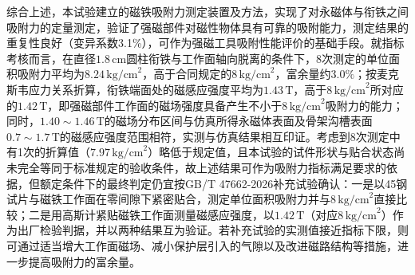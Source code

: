 综合上述，本试验建立的磁铁吸附力测定装置及方法，实现了对永磁体与衔铁之间吸附力的定量测定，验证了强磁部件对磁性物体具有可靠的吸附能力，测定结果的重复性良好（变异系数3.1\%），可作为强磁工具吸附性能评价的基础手段。就指标考核而言，在直径$1.8\,\text{cm}$圆柱衔铁与工作面轴向脱离的条件下，8次测定的单位面积吸附力平均为$8.24\,\text{kg/cm}^2$，高于合同规定的$8\,\text{kg/cm}^2$，富余量约$3.0\%$；按麦克斯韦应力关系折算，衔铁端面处的磁感应强度平均为$1.43\,\text{T}$，高于$8\,\text{kg/cm}^2$所对应的$1.42\,\text{T}$，即强磁部件工作面的磁场强度具备产生不小于$8\,\text{kg/cm}^2$吸附力的能力；同时，$1.40\sim 1.46\,\text{T}$的磁场分布区间与仿真所得永磁体表面及骨架沟槽表面$0.7\sim 1.7\,\text{T}$的磁感应强度范围相符，实测与仿真结果相互印证。考虑到8次测定中有1次的折算值（$7.97\,\text{kg/cm}^2$）略低于规定值，且本试验的试件形状与贴合状态尚未完全等同于标准规定的验收条件，故上述结果可作为吸附力指标满足要求的依据，但额定条件下的最终判定仍宜按GB/T 47662-2026补充试验确认：一是以45钢试片与磁铁工作面在零间隙下紧密贴合，测定单位面积吸附力并与$8\,\text{kg/cm}^2$直接比较；二是用高斯计紧贴磁铁工作面测量磁感应强度，以$1.42\,\text{T}$（对应$8\,\text{kg/cm}^2$）作为出厂检验判据，并以两种结果互为验证。若补充试验的实测值接近指标下限，则可通过适当增大工作面磁场、减小保护层引入的气隙以及改进磁路结构等措施，进一步提高吸附力的富余量。
